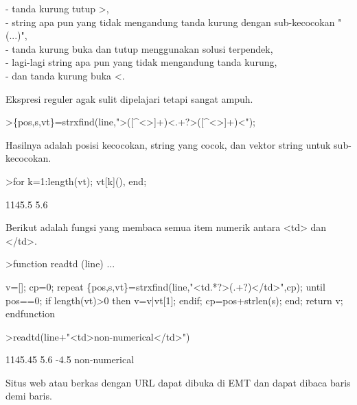 \documentclass[a4paper,10pt]{article}
\begin{document}
\begin{eulernotebook}
\begin{eulercomment}
- tanda kurung tutup \textgreater{},\\
- string apa pun yang tidak mengandung tanda kurung dengan
sub-kecocokan "(...)",\\
- tanda kurung buka dan tutup menggunakan solusi terpendek,\\
- lagi-lagi string apa pun yang tidak mengandung tanda kurung,\\
- dan tanda kurung buka \textless{}.

Ekspresi reguler agak sulit dipelajari tetapi sangat ampuh.
\end{eulercomment}
\begin{eulerprompt}
>\{pos,s,vt\}=strxfind(line,">([^<>]+)<.+?>([^<>]+)<");
\end{eulerprompt}
\begin{eulercomment}
Hasilnya adalah posisi kecocokan, string yang cocok, dan vektor string
untuk sub-kecocokan.
\end{eulercomment}
\begin{eulerprompt}
>for k=1:length(vt); vt[k](), end;
\end{eulerprompt}
\begin{euleroutput}
  1145.5
  5.6
\end{euleroutput}
\begin{eulercomment}
Berikut adalah fungsi yang membaca semua item numerik antara \textless{}td\textgreater{} dan
\textless{}/td\textgreater{}.
\end{eulercomment}
\begin{eulerprompt}
>function readtd (line) ...
\end{eulerprompt}
\begin{eulerudf}
  v=[]; cp=0;
  repeat
     \{pos,s,vt\}=strxfind(line,"<td.*?>(.+?)</td>",cp);
     until pos==0;
     if length(vt)>0 then v=v|vt[1]; endif;
     cp=pos+strlen(s);
  end;
  return v;
  endfunction
\end{eulerudf}
\begin{eulerprompt}
>readtd(line+"<td>non-numerical</td>")
\end{eulerprompt}
\begin{euleroutput}
  1145.45
  5.6
  -4.5
  non-numerical
\end{euleroutput}
\begin{eulercomment}
Situs web atau berkas dengan URL dapat dibuka di EMT dan dapat dibaca
baris demi baris.


\end{eulercomment}
\end{eulernotebook}
\end{document}
